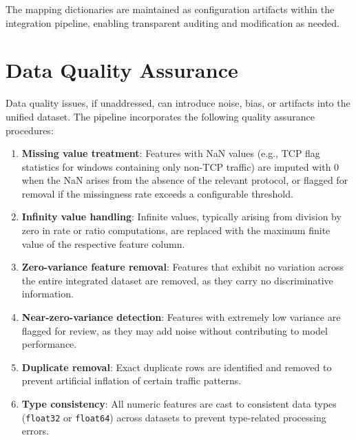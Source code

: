 The mapping dictionaries are maintained as configuration artifacts within the integration pipeline, enabling transparent auditing and modification as needed.

\section{Data Quality Assurance}
\label{sec:quality}

Data quality issues, if unaddressed, can introduce noise, bias, or artifacts into the unified dataset. The pipeline incorporates the following quality assurance procedures:

\begin{enumerate}
    \item \textbf{Missing value treatment}: Features with NaN values (e.g., TCP flag statistics for windows containing only non-TCP traffic) are imputed with 0 when the NaN arises from the absence of the relevant protocol, or flagged for removal if the missingness rate exceeds a configurable threshold.

    \item \textbf{Infinity value handling}: Infinite values, typically arising from division by zero in rate or ratio computations, are replaced with the maximum finite value of the respective feature column.

    \item \textbf{Zero-variance feature removal}: Features that exhibit no variation across the entire integrated dataset are removed, as they carry no discriminative information.

    \item \textbf{Near-zero-variance detection}: Features with extremely low variance are flagged for review, as they may add noise without contributing to model performance.

    \item \textbf{Duplicate removal}: Exact duplicate rows are identified and removed to prevent artificial inflation of certain traffic patterns.

    \item \textbf{Type consistency}: All numeric features are cast to consistent data types (\texttt{float32} or \texttt{float64}) across datasets to prevent type-related processing errors.
\end{enumerate}

